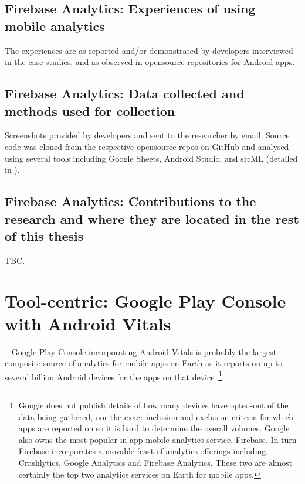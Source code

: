 \subsection{Firebase Analytics: Experiences of using mobile analytics}
The experiences are as reported and/or demonstrated by developers interviewed in the case studies, and as observed in opensource repositories for Android apps.

\subsection{Firebase Analytics: Data collected and methods used for collection}
Screenshots provided by developers and sent to the researcher by email. Source code was cloned from the respective opensource repos on GitHub and analysed using several tools including Google Sheets, Android Studio, and srcML (detailed in \citet{harty2021_logging_practices_with_mobile_analytics}).

\subsection{Firebase Analytics: Contributions to the research and where they are located in the rest of this thesis}
TBC.


\clearpage


\section{Tool-centric: Google Play Console with Android Vitals}~\label{case-study-overview-google-play-console-with-android-vitals}
Google Play Console incorporating Android Vitals is probably the largest composite source of analytics for mobile apps on Earth as it reports on up to several billion Android devices for the apps on that device~\footnote{Google does not publish details of how many devices have opted-out of the data being gathered, nor the exact inclusion and exclusion criteria for which apps are reported on so it is hard to determine the overall volumes. Google also owns the most popular in-app mobile analytics service, Firebase. In turn Firebase incorporates a movable feast of analytics offerings including Crashlytics, Google Analytics and Firebase Analytics. These two are almost certainly the top two analytics services on Earth for mobile apps.}.

